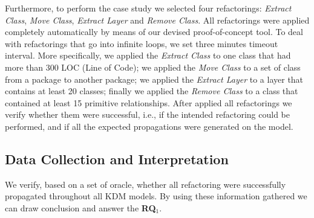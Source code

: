 Furthermore, to perform the case study we selected four refactorings: \textit{Extract Class}, \textit{Move Class}, \textit{Extract Layer} and \textit{Remove Class}. %
All refactorings were applied completely automatically by means of our devised proof-of-concept tool. To deal with refactorings that go into infinite loops, we set three minutes timeout interval. More specifically, we applied the \textit{Extract Class} to one class that had more than 300 LOC (Line of Code); we applied the \textit{Move Class} to a set of  class from a package to another package; we applied the \textit{Extract Layer} to a layer that contains at least 20 classes; finally we applied the \textit{Remove Class} to a class that contained at least 15 primitive relationships. After applied all refactorings we verify whether them were successful, i.e., if the intended refactoring could be performed, and if all the expected propagations were generated on the model. 

\subsection{Data Collection and Interpretation}

We verify, based on a set of oracle, whether all refactoring were successfully propagated throughout all KDM models. By using these information gathered we can draw conclusion and answer the \textbf{RQ$_1$}.


